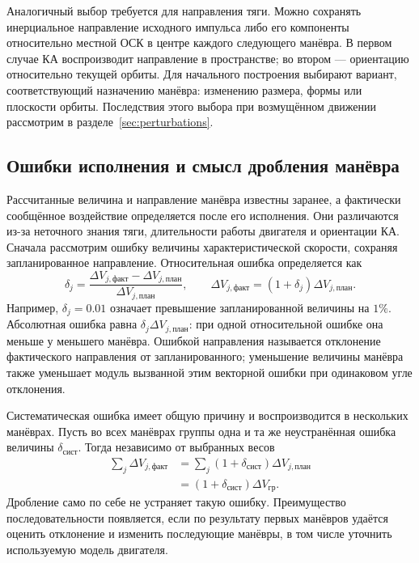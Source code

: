 \documentclass[a4paper,11pt]{article}
\numberwithin{equation}{section}
\begin{document}
Аналогичный выбор требуется для направления тяги.
Можно сохранять инерциальное направление исходного импульса
либо его компоненты относительно местной ОСК в центре каждого
следующего манёвра. В первом случае КА воспроизводит направление
в пространстве; во втором --- ориентацию относительно текущей орбиты.
Для начального построения выбирают вариант, соответствующий
назначению манёвра: изменению размера, формы или плоскости орбиты.
Последствия этого выбора при возмущённом движении рассмотрим
в разделе~\ref{sec:perturbations}.

\subsection{Ошибки исполнения и смысл дробления манёвра}
\label{sec:errors}

Рассчитанные величина и направление манёвра известны заранее,
а фактически сообщённое воздействие определяется после его исполнения.
Они различаются из-за неточного знания тяги, длительности работы
двигателя и ориентации КА. Сначала рассмотрим ошибку величины
характеристической скорости, сохраняя запланированное направление.
Относительная ошибка определяется как
\begin{equation}
\delta_j=
\frac{\Delta V_{j,\text{факт}}-\Delta V_{j,\text{план}}}
     {\Delta V_{j,\text{план}}},\qquad
\Delta V_{j,\text{факт}}=(1+\delta_j)\Delta V_{j,\text{план}}.
\label{eq:relative-error}
\end{equation}
Например, $\delta_j=0.01$ означает превышение запланированной
величины на $1\%$. Абсолютная ошибка равна
$\delta_j\Delta V_{j,\text{план}}$: при одной относительной
ошибке она меньше у меньшего манёвра.
Ошибкой направления называется отклонение фактического направления
от запланированного; уменьшение величины манёвра также уменьшает
модуль вызванной этим векторной ошибки при одинаковом угле отклонения.

Систематическая ошибка имеет общую причину и воспроизводится
в нескольких манёврах. Пусть во всех манёврах группы одна и та же
неустранённая ошибка величины $\delta_{\text{сист}}$.
Тогда независимо от выбранных весов
\begin{equation}
\begin{aligned}
\sum_j\Delta V_{j,\text{факт}}
&=\sum_j(1+\delta_{\text{сист}})\Delta V_{j,\text{план}}\\
&=(1+\delta_{\text{сист}})\Delta V_{\text{гр}}.
\end{aligned}
\label{eq:systematic}
\end{equation}
Дробление само по себе не устраняет такую ошибку.
Преимущество последовательности появляется, если по результату
первых манёвров удаётся оценить отклонение и изменить последующие
манёвры, в том числе уточнить используемую модель двигателя.
\end{document}

